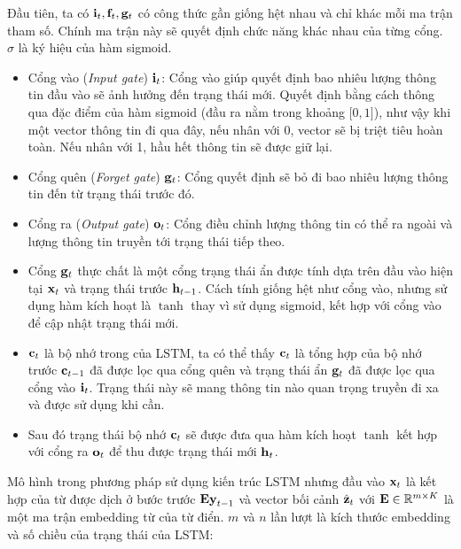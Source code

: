 \documentclass[14pt, a4paper]{article}
\numberwithin{equation}{section}
\numberwithin{algorithm}{section}
\numberwithin{figure}{section}
\numberwithin{table}{section}
\numberwithin{dl}{section}
\numberwithin{md}{section}
\numberwithin{bd}{section}
\numberwithin{dn}{section}
\numberwithin{hq}{section}
\begin{document}
    Đầu tiên, ta có $\bold{i}_t, \bold{f}_t, \bold{g}_t$ có công thức gần giống hệt nhau và chỉ khác mỗi ma trận tham số. 
    Chính ma trận này sẽ quyết định chức năng khác nhau của từng cổng.
    $\sigma$ là ký hiệu của hàm sigmoid.

    \begin{itemize}
        \item Cổng vào (\textit{Input gate}) $\bold{i}_t$: Cổng vào giúp quyết định bao nhiêu lượng thông tin đầu vào sẽ ảnh hưởng đến trạng thái mới. 
        Quyết định bằng cách  thông qua đặc điểm của hàm sigmoid (đầu ra nằm trong khoảng $\lbrack 0, 1\rbrack$), như vậy khi một vector thông tin đi qua đây, nếu nhân với 0, vector sẽ bị triệt tiêu hoàn toàn. Nếu nhân với 1, hầu hết thông tin sẽ được giữ lại.
        \item Cổng quên (\textit{Forget gate}) $\bold{g}_t$: Cổng quyết định sẽ bỏ đi bao nhiêu lượng thông tin đến từ trạng thái trước đó.
        \item Cổng ra (\textit{Output gate}) $\bold{o}_t$: Cổng điều chỉnh lượng thông tin có thể ra ngoài và lượng thông tin truyền tới trạng thái tiếp theo.
        \item Cổng $\bold{g}_t$ thực chất là một cổng trạng thái ẩn được tính dựa trên đầu vào hiện tại $\bold{x}_t$ và trạng thái trước $\bold{h}_{t-1}$.
        Cách tính giống hệt như cổng vào, nhưng sử dụng hàm kích hoạt là $\tanh$ thay vì sử dụng sigmoid, kết hợp với cổng vào để cập nhật trạng thái mới.
        \item $\bold{c}_t$ là bộ nhớ trong của LSTM, ta có thể thấy $\bold{c}_t$ là tổng hợp của bộ nhớ trước $\bold{c}_{t-1}$ đã được lọc qua cổng quên và trạng thái ẩn $\bold{g}_t$ đã được lọc qua cổng vào $\bold{i}_t$.
        Trạng thái này sẽ mang thông tin nào quan trọng truyền đi xa và được sử dụng khi cần.
        \item Sau đó trạng thái bộ nhớ $\bold{c}_t$ sẽ được đưa qua hàm kích hoạt $\tanh$ kết hợp với cổng ra $\bold{o}_t$ để thu được trạng thái mới $\bold{h}_t$.
    \end{itemize}

    Mô hình trong phương pháp sử dụng kiến trúc LSTM nhưng đầu vào $\bold{x}_t$ là kết hợp của từ được dịch ở bước trước $\bold{Ey}_{t-1}$ và vector bối cảnh $\hat{\bold{z}}_t$ với $\bold{E} \in \mathbb{R}^{m \times K}$ là một ma trận embedding từ của từ điển.
    $m$ và $n$ lần lượt là kích thước embedding và số chiều của trạng thái của LSTM:
\end{document}
